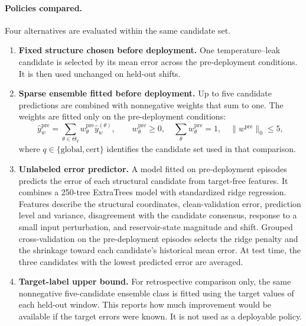 \documentclass[11pt,a4paper]{article}
\begin{document}
\paragraph{Policies compared.}
Four alternatives are evaluated within the same candidate set.
\begin{enumerate}[leftmargin=*]
\item \textbf{Fixed structure chosen before deployment.} One temperature--leak candidate is selected by its mean error across the pre-deployment conditions. It is then used unchanged on held-out shifts.
\item \textbf{Sparse ensemble fitted before deployment.} Up to five candidate predictions are combined with nonnegative weights that sum to one. The weights are fitted only on the pre-deployment conditions:
\begin{equation}
  \widehat y^{\mathrm{pre}}_w
  =\sum_{\theta\in\Theta_q}w^{\mathrm{pre}}_{\theta}\widehat y^{(\theta)}_w,
  \qquad
  w^{\mathrm{pre}}_{\theta}\ge 0,
  \quad
  \sum_{\theta}w^{\mathrm{pre}}_{\theta}=1,
  \quad
  \|w^{\mathrm{pre}}\|_0\le 5,
  \label{eq:historical_sparse}
\end{equation}
where $q\in\{\mathrm{global},\mathrm{cert}\}$ identifies the candidate set used in that comparison.
\item \textbf{Unlabeled error predictor.} A model fitted on pre-deployment episodes predicts the error of each structural candidate from target-free features. It combines a 250-tree ExtraTrees model with standardized ridge regression. Features describe the structural coordinates, clean-validation error, prediction level and variance, disagreement with the candidate consensus, response to a small input perturbation, and reservoir-state magnitude and shift. Grouped cross-validation on the pre-deployment episodes selects the ridge penalty and the shrinkage toward each candidate's historical mean error. At test time, the three candidates with the lowest predicted error are averaged.
\item \textbf{Target-label upper bound.} For retrospective comparison only, the same nonnegative five-candidate ensemble class is fitted using the target values of each held-out window. This reports how much improvement would be available if the target errors were known. It is not used as a deployable policy.
\end{enumerate}
\end{document}
